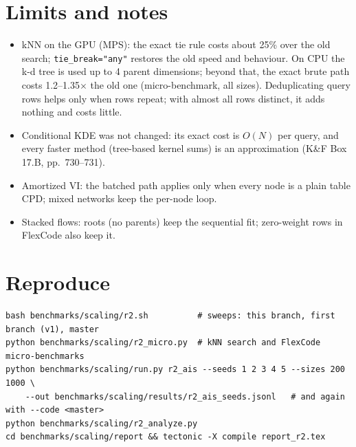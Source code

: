 \documentclass[10pt,a4paper]{article}
\newcommand{\code}[1]{\texttt{#1}}
\begin{document}
\section{Limits and notes}
\begin{itemize}
  \item kNN on the GPU (MPS): the exact tie rule costs about 25\% over the old search;
  \code{tie\_break="any"} restores the old speed and behaviour. On CPU the k-d tree is used up to
  4 parent dimensions; beyond that, the exact brute path costs 1.2--1.35$\times$ the old one (micro-benchmark, all sizes). Deduplicating query rows helps only when rows repeat; with almost all rows distinct, it adds nothing and costs little.
  \item Conditional KDE was not changed: its exact cost is $O(N)$ per query, and every faster
  method (tree-based kernel sums) is an approximation (K\&F Box 17.B, pp.\ 730--731).
  \item Amortized VI: the batched path applies only when every node is a plain table CPD; mixed
  networks keep the per-node loop.
  \item Stacked flows: roots (no parents) keep the sequential fit; zero-weight rows in FlexCode
  also keep it.
\end{itemize}

\section*{Reproduce}
\begin{verbatim}
bash benchmarks/scaling/r2.sh          # sweeps: this branch, first branch (v1), master
python benchmarks/scaling/r2_micro.py  # kNN search and FlexCode micro-benchmarks
python benchmarks/scaling/run.py r2_ais --seeds 1 2 3 4 5 --sizes 200 1000 \
    --out benchmarks/scaling/results/r2_ais_seeds.jsonl   # and again with --code <master>
python benchmarks/scaling/r2_analyze.py
cd benchmarks/scaling/report && tectonic -X compile report_r2.tex
\end{verbatim}
\end{document}
